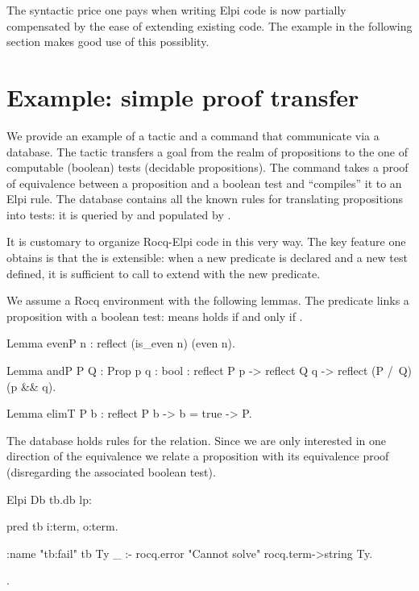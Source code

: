 \documentclass[a4paper, 11pt]{book}
\begin{document}
The syntactic price one pays when writing Elpi code is now partially
compensated by the ease of extending existing code.
The example in the following section makes good use of this possiblity.

\section{Example: simple proof transfer}\label{sec:tb}

We provide an example of a tactic and a command that communicate via
a database. The tactic  transfers a goal from the realm
of propositions to the one of computable (boolean) tests (decidable propositions).
The command  takes a proof of equivalence
between a proposition and a boolean test and ``compiles'' it to an Elpi rule.
The database contains all the known rules for translating propositions into
tests: it is queried by  and populated by .

It is customary to organize Rocq-Elpi code in this very way. The key feature
one obtains is that the  is extensible: when a new
predicate is declared and a new test defined, it is sufficient to call
 to extend  with the new
predicate.

We assume a Rocq environment with the following lemmas. The 
predicate links a proposition with a boolean test: 
means  holds if and only if .

\begin{rocqcode}
Lemma evenP n : reflect (is_even n) (even n).

Lemma andP  {P Q : Prop} {p q : bool} :
  reflect P p -> reflect Q q -> reflect (P /\ Q) (p && q).

Lemma elimT {P b} :
  reflect P b -> b = true -> P.
\end{rocqcode}

The database holds rules for the  relation. Since
we are only interested in one direction of the equivalence we
relate a proposition with its equivalence proof (disregarding the
associated boolean test).

\begin{rocqcode}
Elpi Db tb.db lp:{{

pred tb i:term, o:term.

:name "tb:fail"
tb Ty _ :- rocq.error "Cannot solve" {rocq.term->string Ty}.

}}.
\end{rocqcode}
\end{document}
